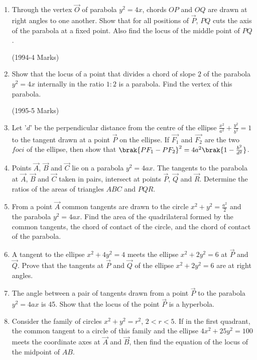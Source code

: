 \begin{enumerate}
      \item Through the vertex $\vec{O}$ of parabola $y^2=4x$, chords $OP$ and $OQ$ are drawn at right angles to one another. Show that for all positions of $\vec{P}$, $PQ$ cuts the axis of the parabola at a fixed point. Also find the locus of the middle point of $PQ$. 

		\hfill(1994-4 Marks)
		
      \item Show that the locus of a point that divides a chord of slope $2$ of the parabola $y^2=4x$ internally in the ratio $1:2$ is a parabola. Find the vertex of this parabola. 

	      \hfill(1995-5 Marks)
\item Let '$d$' be the perpendicular distance from the centre of the ellipse $\frac{x^2}{a^2}+\frac{y^2}{b^2}=1$ to the tangent drawn at a point $\vec{P}$ on the ellipse. If $\vec{F_1}$ and $\vec{F_2}$ are the two $foci$ of the ellipse, then show that $\brak{PF_1-PF_2}^2=4a^2\brak{1-\frac{b^2}{d^2}}$. \hfill{}

\item Points $\vec{A}$, $\vec{B}$ and $\vec{C}$ lie on a parabola $y^2=4ax$. The tangents to the parabola at $\vec{A}$, $\vec{B}$ and $\vec{C}$ taken in pairs, intersect at points $\vec{P}$, $\vec{Q}$ and $\vec{R}$. Determine the ratios of the areas of triangles $ABC$ and $PQR$. \hfill{}

\item From a point $\vec{A}$ common tangents are drawn to the circle $x^2+y^2=\frac{a^2}{2}$ and the parabola $y^2=4ax$. Find the area of the quadrilateral formed by the common tangents, the chord of contact of the circle, and the chord of contact of the parabola. \hfill{}

\item A tangent to the ellipse $x^2+4y^2=4$ meets the ellipse $x^2+2y^2=6$ at $\vec{P}$ and $\vec{Q}$. Prove that the tangents at $\vec{P}$ and $\vec{Q}$ of the ellipse $x^2+2y^2=6$ are at right angles. \hfill{}

\item The angle between a pair of tangents drawn from a point $\vec{P}$ to the parabola $y^2=4ax$ is 45\degree. Show that the locus of the point $\vec{P}$ is a hyperbola. \hfill{}

\item Consider the family of circles $x^2+y^2=r^2$, $2<r<5$. If in the first quadrant, the common tangent to a circle of this family and the ellipse $4x^2+25y^2=100$ meets the coordinate axes at $\vec{A}$ and $\vec{B}$, then find the equation of the locus of the midpoint of $AB$. \hfill{}


\end{enumerate}
